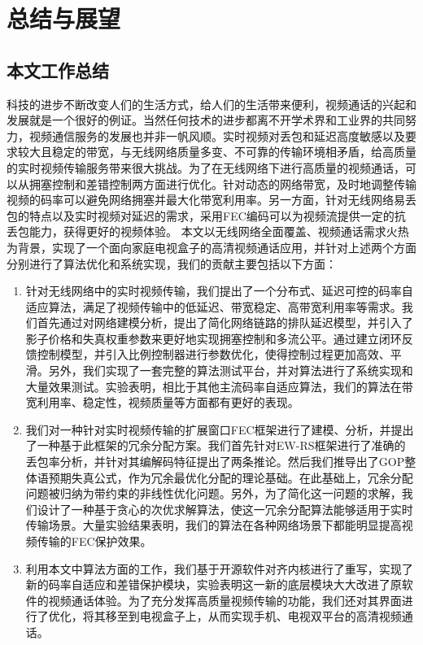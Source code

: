 \chapter{总结与展望}
\label{chap:conclusion}

\section{本文工作总结}
科技的进步不断改变人们的生活方式，给人们的生活带来便利，视频通话的兴起和发展就是一个很好的例证。当然任何技术的进步都离不开学术界和工业界的共同努力，视频通信服务的发展也并非一帆风顺。实时视频对丢包和延迟高度敏感以及要求较大且稳定的带宽，与无线网络质量多变、不可靠的传输环境相矛盾，给高质量的实时视频传输服务带来很大挑战。为了在无线网络下进行高质量的视频通话，可以从拥塞控制和差错控制两方面进行优化。针对动态的网络带宽，及时地调整传输视频的码率可以避免网络拥塞并最大化带宽利用率。另一方面，针对无线网络易丢包的特点以及实时视频对延迟的需求，采用FEC编码可以为视频流提供一定的抗丢包能力，获得更好的视频体验。
本文以无线网络全面覆盖、视频通话需求火热为背景，实现了一个面向家庭电视盒子的高清视频通话应用，并针对上述两个方面分别进行了算法优化和系统实现，我们的贡献主要包括以下方面：
\begin{enumerate}
    \item 针对无线网络中的实时视频传输，我们提出了一个分布式、延迟可控的码率自适应算法，满足了视频传输中的低延迟、带宽稳定、高带宽利用率等需求。我们首先通过对网络建模分析，提出了简化网络链路的排队延迟模型，并引入了影子价格和失真权重参数来更好地实现拥塞控制和多流公平。通过建立闭环反馈控制模型，并引入比例控制器进行参数优化，使得控制过程更加高效、平滑。另外，我们实现了一套完整的算法测试平台，并对算法进行了系统实现和大量效果测试。实验表明，相比于其他主流码率自适应算法，我们的算法在带宽利用率、稳定性，视频质量等方面都有更好的表现。
    \item 我们对一种针对实时视频传输的扩展窗口FEC框架进行了建模、分析，并提出了一种基于此框架的冗余分配方案。我们首先针对EW-RS框架进行了准确的丢包率分析，并针对其编解码特征提出了两条推论。然后我们推导出了GOP整体语预期失真公式，作为冗余最优化分配的理论基础。在此基础上，冗余分配问题被归纳为带约束的非线性优化问题。另外，为了简化这一问题的求解，我们设计了一种基于贪心的次优求解算法，使这一冗余分配算法能够适用于实时传输场景。大量实验结果表明，我们的算法在各种网络场景下都能明显提高视频传输的FEC保护效果。
    \item 利用本文中算法方面的工作，我们基于开源软件对齐内核进行了重写，实现了新的码率自适应和差错保护模块，实验表明这一新的底层模块大大改进了原软件的视频通话体验。为了充分发挥高质量视频传输的功能，我们还对其界面进行了优化，将其移至到电视盒子上，从而实现手机、电视双平台的高清视频通话。
\end{enumerate}


